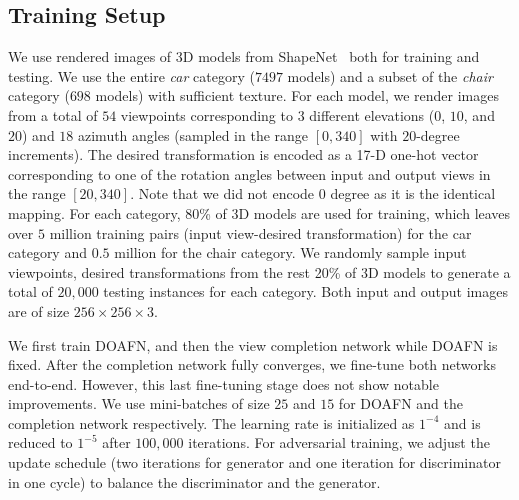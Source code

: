 \documentclass[10pt,twocolumn,letterpaper]{article}
\begin{document}
\subsection{Training Setup}
We use rendered images of 3D models from ShapeNet~\cite{shapenet2015} both for training and testing. We use the entire \emph{car} category ($7497$ models) and a subset of the \emph{chair} category ($698$ models) with sufficient texture. For each model, we render images from a total of $54$ viewpoints corresponding to $3$ different elevations ($0$, $10$, and $20$) and $18$ azimuth angles (sampled in the range $[0,340]$ with $20$-degree increments). The desired transformation is encoded as a 17-D one-hot vector corresponding to one of the rotation angles between input and output views in the range $[20,340]$. Note that we did not encode 0 degree as it is the identical mapping. For each category, 80\% of 3D models are used for training, which leaves over $5$ million training pairs (input view-desired transformation) for the car category and $0.5$ million for the chair category. We randomly sample input viewpoints, desired transformations from the rest 20\% of 3D models to generate a total of $20,000$ testing instances for each category. Both input and output images are of size $256\!\times\!256\!\times\!3$. 
%

We first train DOAFN, and then the view completion network while DOAFN is fixed. After the completion network fully converges, we fine-tune both networks end-to-end. However, this last fine-tuning stage does not show notable improvements. We use mini-batches of size $25$ and $15$ for DOAFN and the completion network respectively. The learning rate is initialized as $1^{-4}$ and is reduced to $1^{-5}$ after $100,000$ iterations. For adversarial training, we adjust the update schedule (two iterations for generator and one iteration for discriminator in one cycle) to balance the discriminator and the generator.
\end{document}
